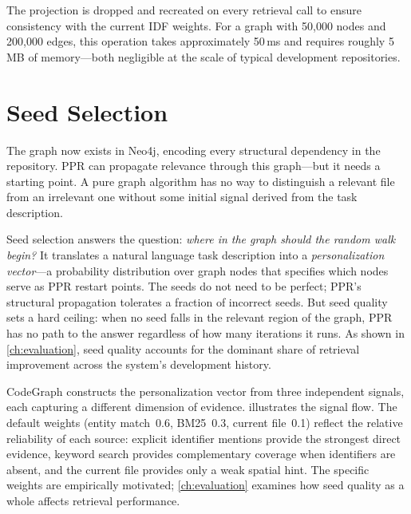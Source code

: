 The projection is dropped and recreated on every retrieval call to ensure consistency with the current IDF weights. For a graph with 50,000 nodes and 200,000 edges, this operation takes approximately 50\,ms and requires roughly 5\,MB of memory---both negligible at the scale of typical development repositories.


\section{Seed Selection}
\label{sec:seed-selection}

The graph now exists in Neo4j, encoding every structural dependency in the repository. PPR can propagate relevance through this graph---but it needs a starting point. A pure graph algorithm has no way to distinguish a relevant file from an irrelevant one without some initial signal derived from the task description.

Seed selection answers the question: \emph{where in the graph should the random walk begin?} It translates a natural language task description into a \emph{personalization vector}---a probability distribution over graph nodes that specifies which nodes serve as PPR restart points. The seeds do not need to be perfect; PPR's structural propagation tolerates a fraction of incorrect seeds. But seed quality sets a hard ceiling: when no seed falls in the relevant region of the graph, PPR has no path to the answer regardless of how many iterations it runs. As shown in \cref{ch:evaluation}, seed quality accounts for the dominant share of retrieval improvement across the system's development history.

CodeGraph constructs the personalization vector from three independent signals, each capturing a different dimension of evidence.  illustrates the signal flow. The default weights (entity match~0.6, BM25~0.3, current file~0.1) reflect the relative reliability of each source: explicit identifier mentions provide the strongest direct evidence, keyword search provides complementary coverage when identifiers are absent, and the current file provides only a weak spatial hint. The specific weights are empirically motivated; \cref{ch:evaluation} examines how seed quality as a whole affects retrieval performance.

